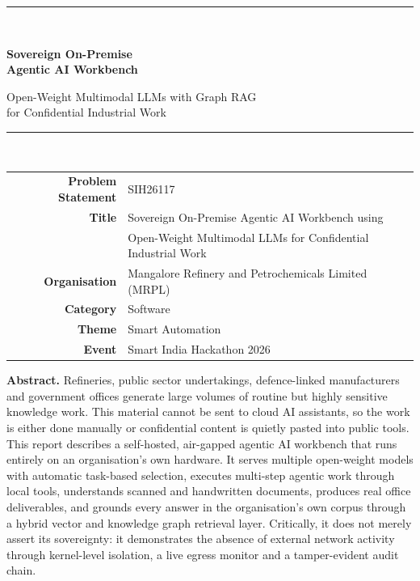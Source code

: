 \begin{titlepage}
\centering
\vspace*{1.2cm}

{\color{accent}\rule{\linewidth}{1.2pt}}\\[0.5cm]
{\Huge\bfseries Sovereign On-Premise\\[0.25cm] Agentic AI Workbench\par}
\vspace{0.35cm}
{\large\color{ink} Open-Weight Multimodal LLMs with Graph RAG\\
for Confidential Industrial Work\par}
\vspace{0.3cm}
{\color{accent}\rule{\linewidth}{1.2pt}}\\[1.0cm]

\begin{minipage}{0.85\linewidth}\centering
\renewcommand{\arraystretch}{1.35}
\begin{tabular}{r l}
\textbf{Problem Statement} & SIH26117 \\
\textbf{Title} & Sovereign On-Premise Agentic AI Workbench using \\
 & Open-Weight Multimodal LLMs for Confidential Industrial Work \\
\textbf{Organisation} & Mangalore Refinery and Petrochemicals Limited (MRPL) \\
\textbf{Category} & Software \\
\textbf{Theme} & Smart Automation \\
\textbf{Event} & Smart India Hackathon 2026 \\
\end{tabular}
\end{minipage}

\vfill

\begin{minipage}{0.92\linewidth}
\colorbox{soft}{\begin{minipage}{\dimexpr\linewidth-2\fboxsep}
\vspace{6pt}
\textbf{\color{accent}Abstract.}\;
Refineries, public sector undertakings, defence-linked manufacturers and
government offices generate large volumes of routine but highly sensitive
knowledge work. This material cannot be sent to cloud AI assistants, so the
work is either done manually or confidential content is quietly pasted into
public tools. This report describes a self-hosted, air-gapped agentic AI
workbench that runs entirely on an organisation's own hardware. It serves
multiple open-weight models with automatic task-based selection, executes
multi-step agentic work through local tools, understands scanned and
handwritten documents, produces real office deliverables, and grounds every
answer in the organisation's own corpus through a hybrid vector and knowledge
graph retrieval layer. Critically, it does not merely assert its sovereignty:
it demonstrates the absence of external network activity through kernel-level
isolation, a live egress monitor and a tamper-evident audit chain.
\vspace{6pt}
\end{minipage}}
\end{minipage}


\end{titlepage}
